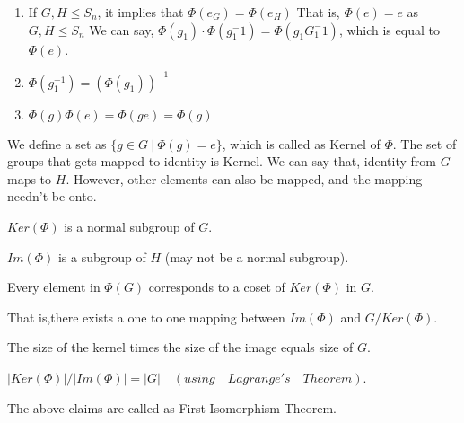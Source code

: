  
 \begin{observation}
 \begin{enumerate}
 \item If $G,H \leqslant S_n$, it implies that $\Phi(e_G)= \Phi(e_H)$
 That is, $\Phi(e)= e$ as $G,H \leqslant S_n$
 We can say, $\Phi(g_1)\cdot\Phi(g_1^-1) = \Phi(g_1G_1^-1)$, which is equal to $\Phi(e)$.
 
 \item $\Phi(g_1^{-1}) = (\Phi(g_1))^{-1}$
 \item $\Phi(g)\Phi(e) = \Phi(ge) = \Phi(g)$

  \end{enumerate}
  \end{observation}
We define a set as $\{g\in G ~|~ \Phi(g)=e\}$, which is called as Kernel of $\Phi$. The set of groups that gets mapped to identity is Kernel.
We can say that, identity from $G$ maps to $H$. However, other elements can also be mapped, and the mapping needn't be onto.

\begin{claim}
$Ker(\Phi)$ is a normal subgroup of $G$.
\end{claim}
\begin{claim}
$Im(\Phi)$ is a subgroup of $H$ (may not be a normal subgroup).
\end{claim}

\begin{claim}
Every element in $\Phi(G)$ corresponds to a coset of $Ker(\Phi)$ in $G$.


That is,there exists a one to one mapping between $Im(\Phi)$ and $G/Ker(\Phi).$
\end{claim}

\begin{claim}
The size of the kernel times the size of the image equals size of $G$.

$|Ker(\Phi)|/|Im(\Phi)|= |G|\quad (using\quad Lagrange's\quad Theorem)$.
\end{claim}

The above claims are called as First Isomorphism Theorem. 
 
 
 
 
 
 
 
 
 
 
 
 



 










 





















